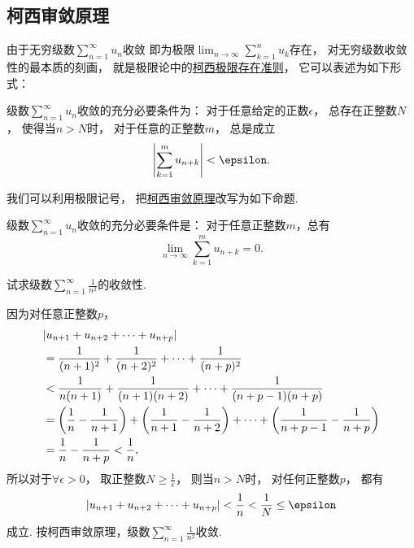 \subsection{柯西审敛原理}
由于无穷级数\(\sum_{n=1}^\infty u_n\)收敛
即为极限\(\lim_{n\to\infty} \sum_{k=1}^n u_k\)存在，
对无穷级数收敛性的最本质的刻画，
就是极限论中的\hyperref[theorem:极限.函数的柯西极限存在准则]{柯西极限存在准则}，
它可以表述为如下形式：
\begin{theorem}[柯西审敛原理]\label{theorem:无穷级数.级数的柯西审敛原理}
级数\(\sum_{n=1}^\infty u_n\)收敛的充分必要条件为：
对于任意给定的正数\(\epsilon\)，
总存在正整数\(N\)，
使得当\(n>N\)时，
对于任意的正整数\(m\)，
总是成立\[
	\abs{ \sum_{k=1}^m u_{n+k} }
	< \epsilon.
\]
\end{theorem}

我们可以利用极限记号，
把\hyperref[theorem:无穷级数.级数的柯西审敛原理]{柯西审敛原理}改写为如下命题.
\begin{proposition}
级数\(\sum_{n=1}^\infty u_n\)收敛的充分必要条件是：
对于任意正整数\(m\)，总有\[
	\lim_{n\to\infty} \sum_{k=1}^m u_{n+k} = 0.
\]
\end{proposition}

\begin{example}
试求级数\(\sum_{n=1}^\infty \frac{1}{n^2}\)的收敛性.
\begin{solution}
因为对任意正整数\(p\)，\begin{align*}
	&\abs{u_{n+1}+u_{n+2}+\dotsb+u_{n+p}} \\
	&=\frac{1}{(n+1)^2}+\frac{1}{(n+2)^2}+\dotsb+\frac{1}{(n+p)^2} \\
	&<\frac{1}{n(n+1)}+\frac{1}{(n+1)(n+2)}+\dotsb+\frac{1}{(n+p-1)(n+p)} \\
	&=\left(\frac{1}{n}-\frac{1}{n+1}\right)
		+\left(\frac{1}{n+1}-\frac{1}{n+2}\right)
		+\dotsb+\left(\frac{1}{n+p-1}-\frac{1}{n+p}\right) \\
	&=\frac{1}{n}-\frac{1}{n+p} < \frac{1}{n},
\end{align*}
所以对于\(\forall \epsilon > 0\)，
取正整数\(N \geq \frac{1}{\epsilon}\)，
则当\(n > N\)时，
对任何正整数\(p\)，
都有\[
	\abs{u_{n+1}+u_{n+2}+\dotsb+u_{n+p}}
	< \frac{1}{n}
	< \frac{1}{N}
	\leq \epsilon
\]成立.
按柯西审敛原理，级数\(\sum_{n=1}^\infty \frac{1}{n^2}\)收敛.
\end{solution}
\end{example}


